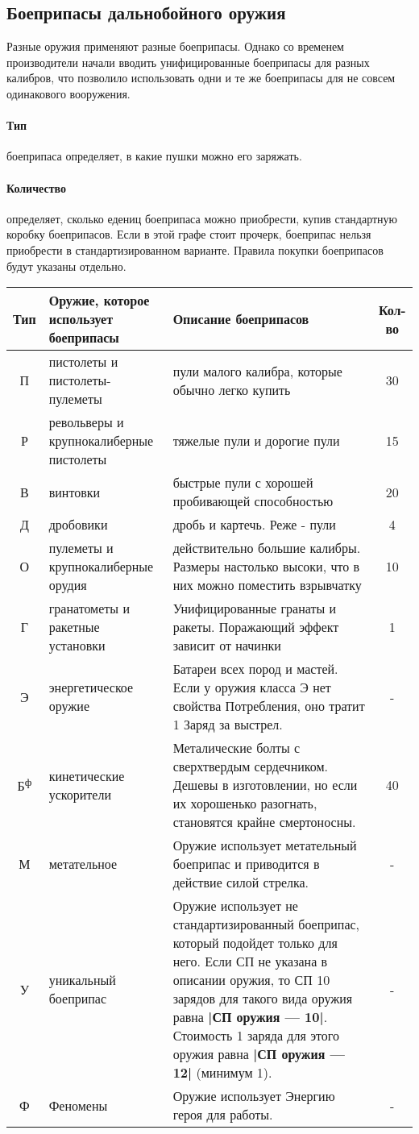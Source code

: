 \subsection{Боеприпасы дальнобойного оружия}
Разные оружия применяют разные боеприпасы. Однако со временем производители начали вводить унифицированные боеприпасы для разных калибров, что позволило использовать одни и те же боеприпасы для не совсем одинакового вооружения.
\paragraph{Тип} боеприпаса определяет, в какие пушки можно его заряжать.
\paragraph{Количество} определяет, сколько едениц боеприпаса можно приобрести, купив стандартную коробку боеприпасов. Если в этой графе стоит прочерк, боеприпас нельзя приобрести в стандартизированном варианте. Правила покупки боеприпасов будут указаны отдельно.
\begin{tabular}{|c|p{3cm}|p{10cm}|c|}
\hline
Тип & Оружие, которое использует боеприпасы & Описание боеприпасов & Кол-во\\ \hline
П & пистолеты и пистолеты-пулеметы & пули малого калибра, которые обычно легко купить & 30\\ \hline
Р & револьверы и крупнокалиберные пистолеты & тяжелые пули и дорогие пули & 15\\ \hline
В & винтовки & быстрые пули с хорошей пробивающей способностью & 20\\ \hline
Д & дробовики & дробь и картечь. Реже - пули & 4\\ \hline
О & пулеметы и крупнокалиберные орудия & действительно большие калибры. Размеры настолько высоки, что в них можно поместить взрывчатку & 10\\ \hline
Г & гранатометы и ракетные установки & Унифицированные гранаты и ракеты. Поражающий эффект зависит от начинки & 1\\ \hline
Э & энергетическое оружие & Батареи всех пород и мастей. Если у оружия класса Э нет свойства Потребления, оно тратит 1 Заряд за выстрел. & -\\ \hline
Б\textsuperscript{ф} & кинетические ускорители & Металические болты с сверхтвердым сердечником. Дешевы в изготовлении, но если их хорошенько разогнать, становятся крайне смертоносны. & 40\\ \hline
М & метательное & Оружие использует метательный боеприпас и приводится в действие силой стрелка. & -\\ \hline
У & уникальный боеприпас & Оружие использует не стандартизированный боеприпас, который подойдет только для него. Если СП не указана в описании оружия, то СП 10 зарядов для такого вида оружия равна \textbf{|СП оружия — 10|}. Стоимость 1 заряда для этого оружия равна \textbf{|СП оружия — 12|} (минимум 1). & -\\ \hline
Ф & Феномены & Оружие использует Энергию героя для работы. & -\\ \hline
\end{tabular}

